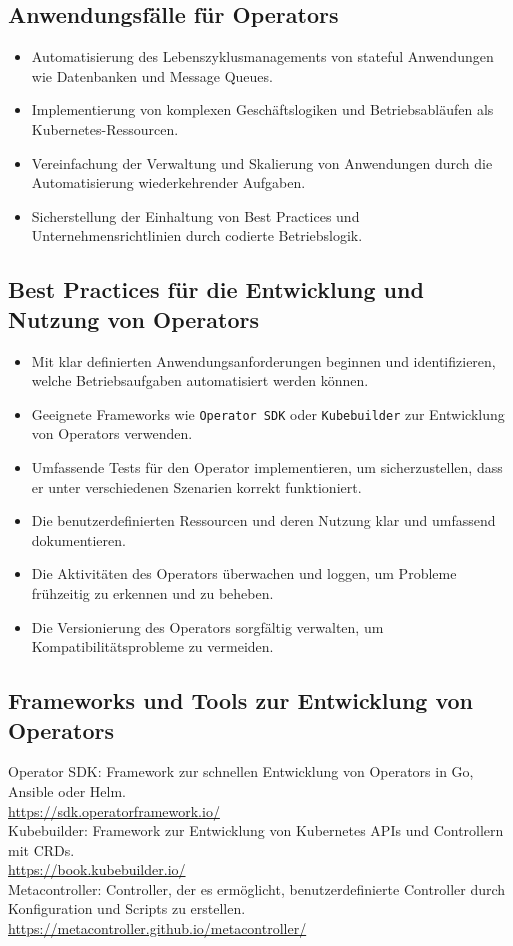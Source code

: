 \subsection{Anwendungsfälle für Operators}
\begin{itemize}
    \item Automatisierung des Lebenszyklusmanagements von stateful Anwendungen wie Datenbanken und Message Queues.
    \item Implementierung von komplexen Geschäftslogiken und Betriebsabläufen als Kubernetes-Ressourcen.
    \item Vereinfachung der Verwaltung und Skalierung von Anwendungen durch die Automatisierung wiederkehrender Aufgaben.
    \item Sicherstellung der Einhaltung von Best Practices und Unternehmensrichtlinien durch codierte Betriebslogik.
\end{itemize}

\subsection{Best Practices für die Entwicklung und Nutzung von Operators}
\begin{itemize}
    \item Mit klar definierten Anwendungsanforderungen beginnen und identifizieren, welche Betriebsaufgaben automatisiert werden können.
    \item Geeignete Frameworks wie \texttt{Operator SDK} oder \texttt{Kubebuilder} zur Entwicklung von Operators verwenden.
    \item Umfassende Tests für den Operator implementieren, um sicherzustellen, dass er unter verschiedenen Szenarien korrekt funktioniert.
    \item Die benutzerdefinierten Ressourcen und deren Nutzung klar und umfassend dokumentieren.
    \item Die Aktivitäten des Operators überwachen und loggen, um Probleme frühzeitig zu erkennen und zu beheben.
    \item Die Versionierung des Operators sorgfältig verwalten, um Kompatibilitätsprobleme zu vermeiden.
\end{itemize}

\subsection{Frameworks und Tools zur Entwicklung von Operators}
Operator SDK: Framework zur schnellen Entwicklung von Operators in Go, Ansible oder Helm.\\
\url{https://sdk.operatorframework.io/}\\
Kubebuilder: Framework zur Entwicklung von Kubernetes APIs und Controllern mit CRDs.\\
\url{https://book.kubebuilder.io/}\\
Metacontroller: Controller, der es ermöglicht, benutzerdefinierte Controller durch Konfiguration und Scripts zu erstellen.\\
\url{https://metacontroller.github.io/metacontroller/}

